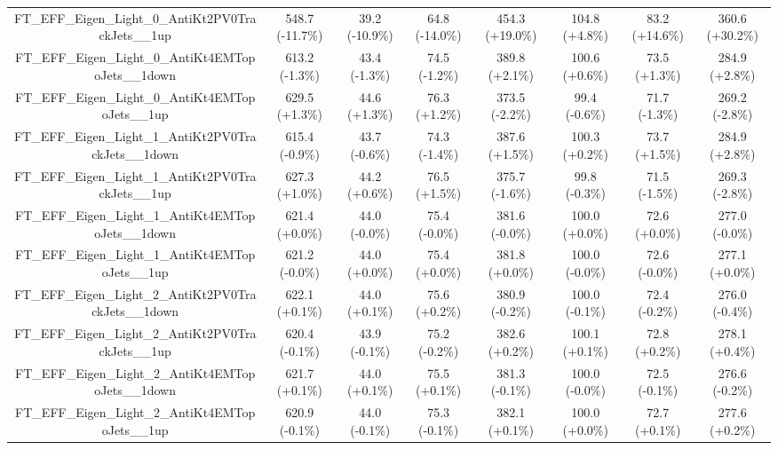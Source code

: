 \begin{table}[htbp!]
\begin{tiny}
\begin{center}
\begin{tabular}{c|c|c|c||c|c|c|c}
FT\_EFF\_Eigen\_Light\_0\_AntiKt2PV0TrackJets\_\_1up         & 548.7     (-11.7\%) & 39.2      (-10.9\%) & 64.8      (-14.0\%) & 454.3     (+19.0\%) & 104.8     (+4.8\%) & 83.2      (+14.6\%) & 360.6     (+30.2\%) \\ 
FT\_EFF\_Eigen\_Light\_0\_AntiKt4EMTopoJets\_\_1down         & 613.2     (-1.3\%) & 43.4      (-1.3\%) & 74.5      (-1.2\%) & 389.8     (+2.1\%) & 100.6     (+0.6\%) & 73.5      (+1.3\%) & 284.9     (+2.8\%) \\ 
FT\_EFF\_Eigen\_Light\_0\_AntiKt4EMTopoJets\_\_1up           & 629.5     (+1.3\%) & 44.6      (+1.3\%) & 76.3      (+1.2\%) & 373.5     (-2.2\%) & 99.4      (-0.6\%) & 71.7      (-1.3\%) & 269.2     (-2.8\%) \\ 
FT\_EFF\_Eigen\_Light\_1\_AntiKt2PV0TrackJets\_\_1down       & 615.4     (-0.9\%) & 43.7      (-0.6\%) & 74.3      (-1.4\%) & 387.6     (+1.5\%) & 100.3     (+0.2\%) & 73.7      (+1.5\%) & 284.9     (+2.8\%) \\ 
FT\_EFF\_Eigen\_Light\_1\_AntiKt2PV0TrackJets\_\_1up         & 627.3     (+1.0\%) & 44.2      (+0.6\%) & 76.5      (+1.5\%) & 375.7     (-1.6\%) & 99.8      (-0.3\%) & 71.5      (-1.5\%) & 269.3     (-2.8\%) \\ 
FT\_EFF\_Eigen\_Light\_1\_AntiKt4EMTopoJets\_\_1down         & 621.4     (+0.0\%) & 44.0      (-0.0\%) & 75.4      (-0.0\%) & 381.6     (-0.0\%) & 100.0     (+0.0\%) & 72.6      (+0.0\%) & 277.0     (-0.0\%) \\ 
FT\_EFF\_Eigen\_Light\_1\_AntiKt4EMTopoJets\_\_1up           & 621.2     (-0.0\%) & 44.0      (+0.0\%) & 75.4      (+0.0\%) & 381.8     (+0.0\%) & 100.0     (-0.0\%) & 72.6      (-0.0\%) & 277.1     (+0.0\%) \\ 
FT\_EFF\_Eigen\_Light\_2\_AntiKt2PV0TrackJets\_\_1down       & 622.1     (+0.1\%) & 44.0      (+0.1\%) & 75.6      (+0.2\%) & 380.9     (-0.2\%) & 100.0     (-0.1\%) & 72.4      (-0.2\%) & 276.0     (-0.4\%) \\ 
FT\_EFF\_Eigen\_Light\_2\_AntiKt2PV0TrackJets\_\_1up         & 620.4     (-0.1\%) & 43.9      (-0.1\%) & 75.2      (-0.2\%) & 382.6     (+0.2\%) & 100.1     (+0.1\%) & 72.8      (+0.2\%) & 278.1     (+0.4\%) \\ 
FT\_EFF\_Eigen\_Light\_2\_AntiKt4EMTopoJets\_\_1down         & 621.7     (+0.1\%) & 44.0      (+0.1\%) & 75.5      (+0.1\%) & 381.3     (-0.1\%) & 100.0     (-0.0\%) & 72.5      (-0.1\%) & 276.6     (-0.2\%) \\ 
FT\_EFF\_Eigen\_Light\_2\_AntiKt4EMTopoJets\_\_1up           & 620.9     (-0.1\%) & 44.0      (-0.1\%) & 75.3      (-0.1\%) & 382.1     (+0.1\%) & 100.0     (+0.0\%) & 72.7      (+0.1\%) & 277.6     (+0.2\%) \\ 

\end{tabular}
\end{center}
\end{tiny}
\end{table}
